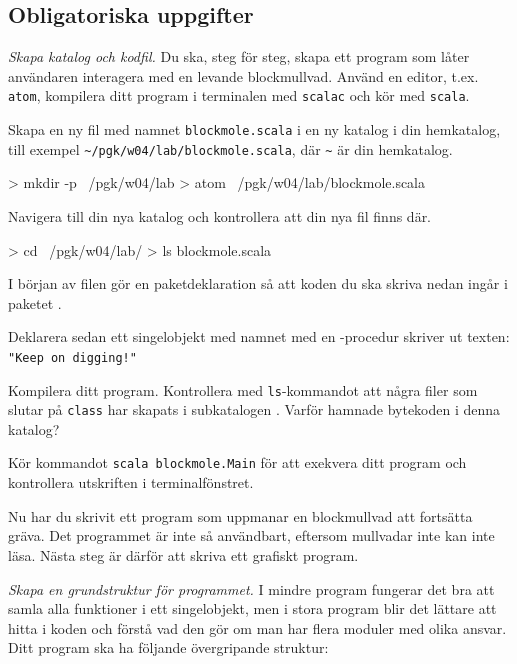 \subsection{Obligatoriska uppgifter}


\Task \emph{Skapa katalog och kodfil.}
Du ska, steg för steg, skapa ett program som låter användaren interagera med en levande blockmullvad. Använd en editor, t.ex. \texttt{atom}, kompilera ditt program i terminalen med \texttt{scalac} och kör med \texttt{scala}.

\Subtask
Skapa en ny fil med namnet \texttt{blockmole.scala} i en ny katalog i din hemkatalog, till exempel \texttt{\textasciitilde/pgk/w04/lab/blockmole.scala}, där \texttt{\textasciitilde} är din hemkatalog.
\begin{REPLnonum}
> mkdir -p ~/pgk/w04/lab
> atom ~/pgk/w04/lab/blockmole.scala
\end{REPLnonum}


\Subtask
Navigera till din nya katalog och kontrollera att din nya fil finns där.
\begin{REPLnonum}
> cd ~/pgk/w04/lab/
> ls
blockmole.scala
\end{REPLnonum}

\Subtask
I början av filen  gör en paketdeklaration så att koden du ska skriva nedan ingår i paketet .

\Subtask
Deklarera sedan ett singelobjekt med namnet  med en -procedur skriver ut texten: \texttt{"Keep on digging!"}

\Subtask
Kompilera ditt program. Kontrollera med \texttt{ls}-kommandot att några filer som slutar på \texttt{class} har skapats i subkatalogen . \Pen Varför hamnade bytekoden i denna katalog?

\Subtask
Kör kommandot \texttt{scala blockmole.Main} för att exekvera ditt program och kontrollera utskriften i terminalfönstret.

\vspace{1em}\noindent Nu har du skrivit ett program som uppmanar en blockmullvad att fortsätta gräva. Det programmet är inte så användbart, eftersom mullvadar inte kan inte läsa. Nästa steg är därför att skriva ett grafiskt program.%



\Task \emph{Skapa en grundstruktur för programmet.}
I mindre program fungerar det bra att samla alla funktioner i ett singelobjekt, men i stora program blir det lättare att hitta i koden och förstå vad den gör om man har flera moduler med olika ansvar. Ditt program ska ha följande övergripande struktur:

